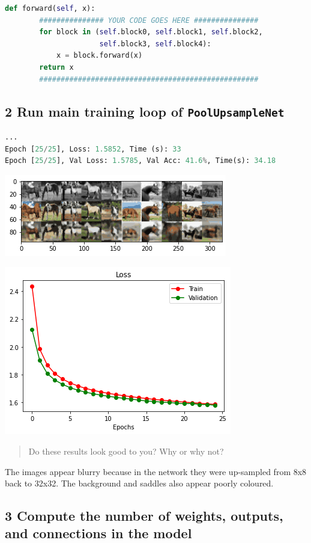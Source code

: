 \documentclass{article}
\begin{document}
\begin{lstlisting}[language=Python]
    def forward(self, x):
        ############### YOUR CODE GOES HERE ###############
        for block in (self.block0, self.block1, self.block2, 
                      self.block3, self.block4):
            x = block.forward(x)
        return x
        ###################################################
\end{lstlisting}

\subsection*{2 Run main training loop of \texttt{PoolUpsampleNet}}

\begin{lstlisting}[language=Python]
...
Epoch [25/25], Loss: 1.5852, Time (s): 33
Epoch [25/25], Val Loss: 1.5785, Val Acc: 41.6%, Time(s): 34.18
\end{lstlisting}

\includegraphics{A2.1.png}

\includegraphics{A2.2.png}

\begin{quote}
Do these results look good to you?  Why or why not?
\end{quote}

The images appear blurry because in the network they were up-sampled from 8x8 back to 32x32. The background and saddles also appear poorly coloured.

\subsection*{3 Compute the number of weights, outputs, and connections in the model}
\end{document}
